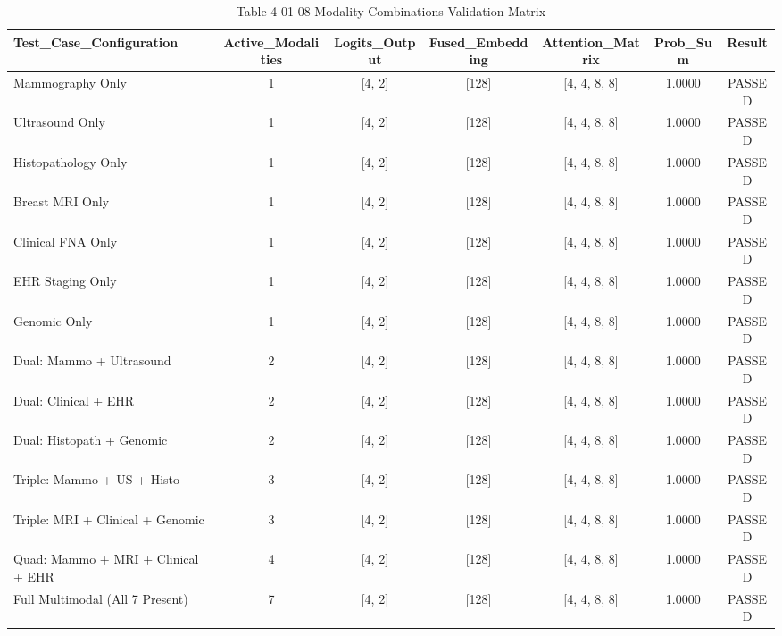 \begin{table}[htbp]
\centering
\small
\begin{tabular}{lcccccc}
\hline
Test\_Case\_Configuration & Active\_Modalities & Logits\_Output & Fused\_Embedding & Attention\_Matrix & Prob\_Sum & Result \\
\hline
Mammography Only & 1 & [4, 2] & [128] & [4, 4, 8, 8] & 1.0000 & PASSED \\
Ultrasound Only & 1 & [4, 2] & [128] & [4, 4, 8, 8] & 1.0000 & PASSED \\
Histopathology Only & 1 & [4, 2] & [128] & [4, 4, 8, 8] & 1.0000 & PASSED \\
Breast MRI Only & 1 & [4, 2] & [128] & [4, 4, 8, 8] & 1.0000 & PASSED \\
Clinical FNA Only & 1 & [4, 2] & [128] & [4, 4, 8, 8] & 1.0000 & PASSED \\
EHR Staging Only & 1 & [4, 2] & [128] & [4, 4, 8, 8] & 1.0000 & PASSED \\
Genomic Only & 1 & [4, 2] & [128] & [4, 4, 8, 8] & 1.0000 & PASSED \\
Dual: Mammo + Ultrasound & 2 & [4, 2] & [128] & [4, 4, 8, 8] & 1.0000 & PASSED \\
Dual: Clinical + EHR & 2 & [4, 2] & [128] & [4, 4, 8, 8] & 1.0000 & PASSED \\
Dual: Histopath + Genomic & 2 & [4, 2] & [128] & [4, 4, 8, 8] & 1.0000 & PASSED \\
Triple: Mammo + US + Histo & 3 & [4, 2] & [128] & [4, 4, 8, 8] & 1.0000 & PASSED \\
Triple: MRI + Clinical + Genomic & 3 & [4, 2] & [128] & [4, 4, 8, 8] & 1.0000 & PASSED \\
Quad: Mammo + MRI + Clinical + EHR & 4 & [4, 2] & [128] & [4, 4, 8, 8] & 1.0000 & PASSED \\
Full Multimodal (All 7 Present) & 7 & [4, 2] & [128] & [4, 4, 8, 8] & 1.0000 & PASSED \\
\hline
\end{tabular}
\caption{Table 4 01 08 Modality Combinations Validation Matrix}
\label{tab:table_4_01_08_modality_combinations_validation_matrix}
\end{table}

